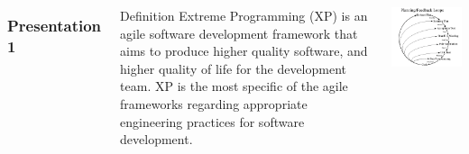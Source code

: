 \begin{frame}
    \begin{columns}

        \frametitle{Presentation 1}
        \begin{block}{Definition}
            Extreme Programming (XP) is an agile software development framework that aims to produce higher quality software, and higher quality of life for the development team. XP is the most specific of the agile frameworks regarding appropriate engineering practices for software development.\cite{alliance}
        \end{block}\pause
        \includegraphics[scale=0.25]{feedback.jpg}\cite{wikipedia}
    \end{columns}
\end{frame}